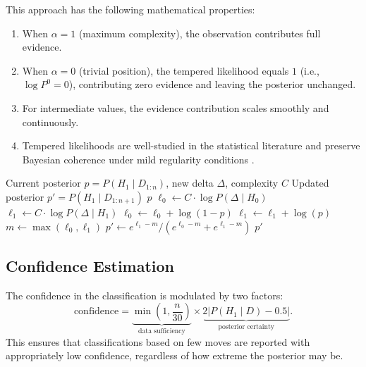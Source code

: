 \documentclass[11pt,a4paper]{article}
\begin{document}
This approach has the following mathematical properties:
\begin{enumerate}
    \item When $\alpha = 1$ (maximum complexity), the observation contributes
          full evidence.
    \item When $\alpha = 0$ (trivial position), the tempered likelihood equals
          $1$ (i.e., $\log P^0 = 0$), contributing zero evidence and leaving
          the posterior unchanged.
    \item For intermediate values, the evidence contribution scales smoothly
          and continuously.
    \item Tempered likelihoods are well-studied in the statistical literature
          and preserve Bayesian coherence under mild regularity conditions
          \citep{grunwald2017inconsistency}.
\end{enumerate}

\begin{algorithm}[H]
\caption{Online Bayesian Update with Tempered Likelihood}
\label{alg:online_update}
\begin{algorithmic}[1]
\Require Current posterior $p = P(H_1 \mid D_{1:n})$, new delta $\Delta$,
         complexity $C$
\Ensure Updated posterior $p' = P(H_1 \mid D_{1:n+1})$
    \State \Return $p$ 
\EndIf
\State $\ell_0 \gets C \cdot \log P(\Delta \mid H_0)$
\State $\ell_1 \gets C \cdot \log P(\Delta \mid H_1)$
\State $\ell_0 \gets \ell_0 + \log(1 - p)$
\State $\ell_1 \gets \ell_1 + \log(p)$
\State $m \gets \max(\ell_0, \ell_1)$
\State $p' \gets e^{\ell_1 - m} \big/ \left(e^{\ell_0 - m} + e^{\ell_1 - m}
    \right)$
\State \Return $p'$
\end{algorithmic}
\end{algorithm}

\subsection{Confidence Estimation}

The confidence in the classification is modulated by two factors:
\begin{equation}
    \text{confidence} = \underbrace{\min\!\left(1, \frac{n}{30}\right)}
    _{\text{data sufficiency}} \times \underbrace{2 \left|P(H_1 \mid D)
    - 0.5\right|}_{\text{posterior certainty}}.
    \label{eq:confidence}
\end{equation}
This ensures that classifications based on few moves are reported with
appropriately low confidence, regardless of how extreme the posterior may be.
\end{document}
